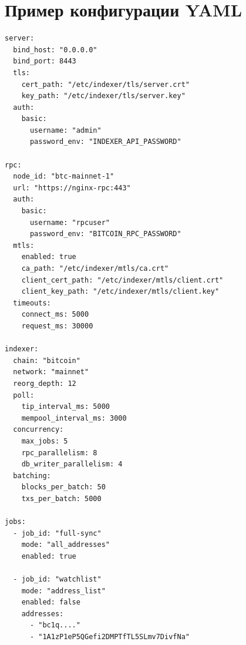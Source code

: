 ﻿\documentclass[14pt,a4paper]{extarticle}
\begin{document}
\newpage

\appendix
\section{Пример конфигурации YAML}
\begin{lstlisting}
server:
  bind_host: "0.0.0.0"
  bind_port: 8443
  tls:
    cert_path: "/etc/indexer/tls/server.crt"
    key_path: "/etc/indexer/tls/server.key"
  auth:
    basic:
      username: "admin"
      password_env: "INDEXER_API_PASSWORD"

rpc:
  node_id: "btc-mainnet-1"
  url: "https://nginx-rpc:443"
  auth:
    basic:
      username: "rpcuser"
      password_env: "BITCOIN_RPC_PASSWORD"
  mtls:
    enabled: true
    ca_path: "/etc/indexer/mtls/ca.crt"
    client_cert_path: "/etc/indexer/mtls/client.crt"
    client_key_path: "/etc/indexer/mtls/client.key"
  timeouts:
    connect_ms: 5000
    request_ms: 30000

indexer:
  chain: "bitcoin"
  network: "mainnet"
  reorg_depth: 12
  poll:
    tip_interval_ms: 5000
    mempool_interval_ms: 3000
  concurrency:
    max_jobs: 5
    rpc_parallelism: 8
    db_writer_parallelism: 4
  batching:
    blocks_per_batch: 50
    txs_per_batch: 5000

jobs:
  - job_id: "full-sync"
    mode: "all_addresses"
    enabled: true

  - job_id: "watchlist"
    mode: "address_list"
    enabled: false
    addresses:
      - "bc1q...."
      - "1A1zP1eP5QGefi2DMPTfTL5SLmv7DivfNa"
\end{lstlisting}

\newpage
\end{document}
